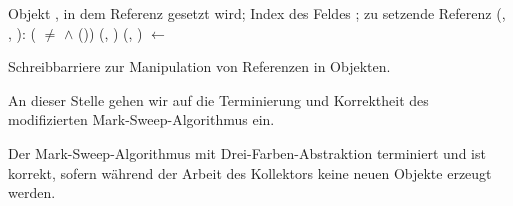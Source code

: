 \begin{algorithm}[h]
\begin{algorithmic}[1]
	\Input Objekt , in dem Referenz gesetzt wird; Index des Feldes ; zu setzende Referenz 
	\State \Atomic {}(, , ):
	\State \quad \IF ( $\neq$ \Null $\wedge$ ())
	\State \quad \quad {}(, )
	\State \quad \quad {}(, )
	\State \quad {} $\gets$ 
\end{algorithmic}
\caption[Schreibbarriere zur Manipulation von Referenzen]{Schreibbarriere zur Manipulation von Referenzen in Objekten.}
\label{algo:tricolor-barrier}
\end{algorithm}

An dieser Stelle gehen wir auf die Terminierung und Korrektheit des modifizierten Mark-Sweep-Algorithmus ein.

\begin{mybox}
\begin{satz}
	Der Mark-Sweep-Algorithmus mit Drei-Farben-Abstraktion terminiert und ist korrekt, sofern während der Arbeit des Kollektors keine neuen Objekte erzeugt werden.
\end{satz}
\end{mybox}

